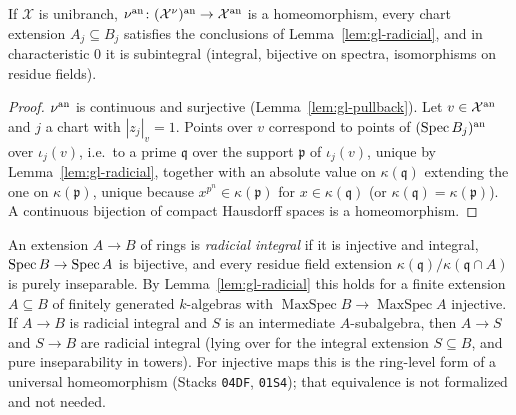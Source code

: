 \begin{lemma}\label{lem:gl-unibranch-universal}
\leanok
{}
If $\mathcal X$ is unibranch, $\nu^{\mathrm{an}}\colon(\mathcal X^\nu)^{\mathrm{an}}\to\mathcal X^{\mathrm{an}}$ is a homeomorphism, every chart extension $A_j\subseteq B_j$ satisfies the conclusions
of Lemma~\ref{lem:gl-radicial}, and in characteristic $0$ it is subintegral (integral, bijective on spectra, isomorphisms on residue fields).
\end{lemma}

\begin{proof}
$\nu^{\mathrm{an}}$ is continuous and surjective (Lemma~\ref{lem:gl-pullback}). Let $v\in\mathcal X^{\mathrm{an}}$ and $j$ a chart with $|z_j|_v=1$. Points over $v$ correspond to points of
$(\operatorname{Spec} B_j)^{\mathrm{an}}$ over $\iota_j(v)$, i.e.\ to a prime $\mathfrak q$ over the support $\mathfrak p$ of $\iota_j(v)$, unique by Lemma~\ref{lem:gl-radicial}, together with an
absolute value on $\kappa(\mathfrak q)$ extending the one on $\kappa(\mathfrak p)$, unique because $x^{p^n}\in\kappa(\mathfrak p)$ for $x\in\kappa(\mathfrak q)$ (or $\kappa(\mathfrak
q)=\kappa(\mathfrak p)$). A continuous bijection of compact Hausdorff spaces is a homeomorphism.
\end{proof}

\begin{definition}\label{def:gl-radicial-integral}
\leanok
{}
An extension $A\to B$ of rings is \emph{radicial integral} if it is injective and integral, $\operatorname{Spec} B\to\operatorname{Spec} A$ is bijective, and every residue field
extension $\kappa(\mathfrak q)/\kappa(\mathfrak q\cap A)$ is purely inseparable. By Lemma~\ref{lem:gl-radicial} this holds for a finite extension $A\subseteq B$ of
finitely generated $k$-algebras with $\operatorname{MaxSpec}B\to\operatorname{MaxSpec}A$ injective. If $A\to B$ is radicial integral and $S$ is an intermediate
$A$-subalgebra, then $A\to S$ and $S\to B$ are radicial integral (lying over for the integral extension $S\subseteq B$, and pure inseparability in towers).
For injective maps this is the ring-level form of a universal homeomorphism (Stacks \texttt{04DF}, \texttt{01S4}); that equivalence is not formalized
and not needed.
\end{definition}

